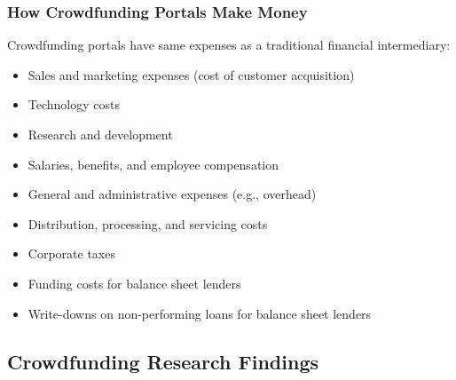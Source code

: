 \documentclass[aspectratio=169,xcolor=dvipsnames]{beamer}
\begin{document}

\begin{frame}
\frametitle{How Crowdfunding Portals Make Money}


Crowdfunding portals have same expenses as a traditional financial intermediary:
\begin{itemize}
    \item Sales and marketing expenses (cost of customer acquisition)
    \item Technology costs
    \item Research and development
    \item Salaries, benefits, and employee compensation
    \item General and administrative expenses (e.g., overhead)
    \item Distribution, processing, and servicing costs
    \item Corporate taxes
    \item Funding costs for balance sheet lenders
    \item Write-downs on non-performing loans for balance sheet lenders
\end{itemize}



\end{frame} 





\subsection{Crowdfunding Research Findings}


\end{document}

